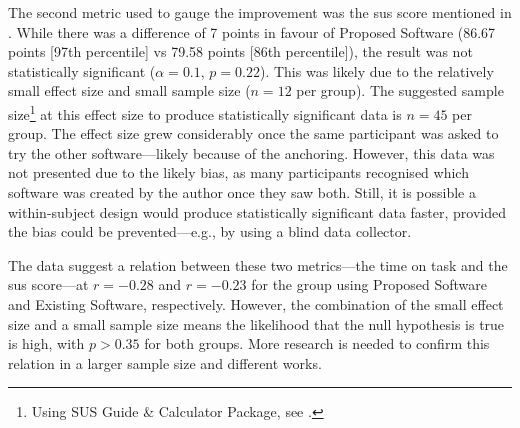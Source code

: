The second metric used to gauge the improvement was the \gls{sus} score mentioned in .
While there was a difference of 7 points in favour of Proposed Software (86.67 points [97th percentile] vs 79.58 points [86th percentile]), the result was not statistically significant ($\alpha=0.1$, $p=0.22$).
This was likely due to the relatively small effect size and small sample size ($n=12$ per group).
The suggested sample size\footnote{Using SUS Guide \& Calculator Package, see .} at this effect size to produce statistically significant data is $n=45$ per group.
The effect size grew considerably once the same participant was asked to try the other software---likely because of the anchoring.
However, this data was not presented due to the likely bias, as many participants recognised which software was created by the author once they saw both.
Still, it is possible a within-subject design would produce statistically significant data faster, provided the bias could be prevented---e.g., by using a blind data collector.

The data suggest a relation between these two metrics---the time on task and the \gls{sus} score---at $r=-0.28$ and $r=-0.23$ for the group using Proposed Software and Existing Software, respectively.
However, the combination of the small effect size and a small sample size means the likelihood that the null hypothesis is true is high, with $p > 0.35$ for both groups.
More research is needed to confirm this relation in a larger sample size and different works.

